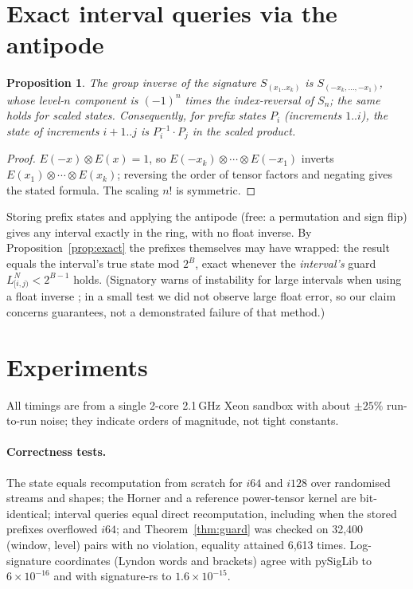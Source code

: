 \documentclass[11pt]{article}
\newtheorem{proposition}{Proposition}
\theoremstyle{remark}\newtheorem{remark}{Remark}
\begin{document}
\section{Exact interval queries via the antipode}\label{sec:interval}
\begin{proposition}\label{prop:anti}
The group inverse of the signature $S_{(x_1..x_k)}$ is $S_{(-x_k,\dots,-x_1)}$, whose level-$n$ component is $(-1)^n$ times the index-reversal of $S_n$; the same holds for scaled states. Consequently, for prefix states $P_i$ (increments $1..i$), the state of increments $i{+}1..j$ is $P_i^{-1}\cdot P_j$ in the scaled product.
\end{proposition}
\begin{proof}
$E(-x)\otimes E(x)=1$, so $E(-x_k)\otimes\cdots\otimes E(-x_1)$ inverts $E(x_1)\otimes\cdots\otimes E(x_k)$; reversing the order of tensor factors and negating gives the stated formula. The scaling $n!$ is symmetric.
\end{proof}
Storing prefix states and applying the antipode (free: a permutation and sign flip) gives any interval exactly in the ring, with no float inverse. By Proposition~\ref{prop:exact} the prefixes themselves may have wrapped: the result equals the interval's true state mod $2^B$, exact whenever the \emph{interval's} guard $L_{[i,j)}^N<2^{B-1}$ holds. (Signatory warns of instability for large intervals when using a float inverse \cite{kidger2021}; in a small test we did not observe large float error, so our claim concerns guarantees, not a demonstrated failure of that method.)

\section{Experiments}\label{sec:exp}
All timings are from a single 2-core 2.1\,GHz Xeon sandbox with about $\pm25\%$ run-to-run noise; they indicate orders of magnitude, not tight constants.

\paragraph{Correctness tests.} The state equals recomputation from scratch for $i64$ and $i128$ over randomised streams and shapes; the Horner and a reference power-tensor kernel are bit-identical; interval queries equal direct recomputation, including when the stored prefixes overflowed $i64$; and Theorem~\ref{thm:guard} was checked on 32{,}400 (window, level) pairs with no violation, equality attained 6{,}613 times. Log-signature coordinates (Lyndon words and brackets) agree with pySigLib to $6\times10^{-16}$ and with signature-rs to $1.6\times10^{-15}$.
\end{document}
